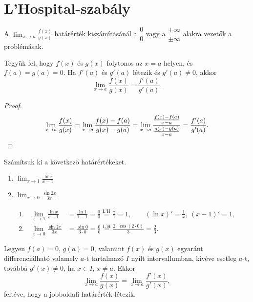 \documentclass[11pt]{article}
\newcommand{\LH}{\overset{\text{L'H}}{=}}
\begin{document}
\section{L'Hospital-szabály}

A $\displaystyle\lim_{x\to a}\frac{f(x)}{g(x)}$ határérték kiszámításánál a $\dfrac{0}{0}$ vagy a $\dfrac{\pm\infty}{\pm\infty}$ alakra vezetők a problémásak.

\begin{thmbox}
\begin{theorem}
Tegyük fel, hogy $f(x)$ és $g(x)$ folytonos az $x=a$ helyen, és $f(a)=g(a)=0$. Ha $f'(a)$ és $g'(a)$ létezik és $g'(a)\neq 0$, akkor
\[
\lim_{x\to a}\frac{f(x)}{g(x)}=\frac{f'(a)}{g'(a)}.
\]
\end{theorem}
\end{thmbox}
\begin{proof}
\[
\lim_{x\to a}\frac{f(x)}{g(x)}=\lim_{x\to a}\frac{f(x)-f(a)}{g(x)-g(a)}
=\lim_{x\to a}\frac{\frac{f(x)-f(a)}{x-a}}{\frac{g(x)-g(a)}{x-a}}=\frac{f'(a)}{g'(a)}. \qedhere
\]
\end{proof}

\begin{exbox}
\begin{example}
Számítsuk ki a következő határértékeket.
\begin{enumerate}[label=\arabic*., itemsep=6pt]
\item $\displaystyle\lim_{x\to 1}\frac{\ln x}{x-1}$
\item $\displaystyle\lim_{x\to 0}\frac{\sin 2x}{3x}$
\end{enumerate}
\end{example}
\end{exbox}
\begin{solution}
\begin{align*}
1.\quad \lim_{x\to 1}\frac{\ln x}{x-1}&=\frac{\ln 1}{1-1}=\frac{0}{0}\LH\frac{\frac{1}{1}}{1}=1,
\qquad (\ln x)'=\frac{1}{x},\ (x-1)'=1,\\[0.4em]
2.\quad \lim_{x\to 0}\frac{\sin 2x}{3x}&=\frac{\sin 0}{3\cdot 0}=\frac{0}{0}\LH\frac{2\cdot\cos(2\cdot 0)}{3}=\frac{2}{3}.
\end{align*}
\end{solution}

\begin{thmbox}
\begin{theorem}
Legyen $f(a)=0$, $g(a)=0$, valamint $f(x)$ és $g(x)$ egyaránt differenciálható valamely $a$-t tartalmazó $I$ nyílt intervallumban, kivéve esetleg $a$-t, továbbá $g'(x)\neq 0$, ha $x\in I$, $x\neq a$. Ekkor
\[
\lim_{x\to a}\frac{f(x)}{g(x)}=\lim_{x\to a}\frac{f'(x)}{g'(x)},
\]
feltéve, hogy a jobboldali határérték létezik.
\end{theorem}
\end{thmbox}
\end{document}
